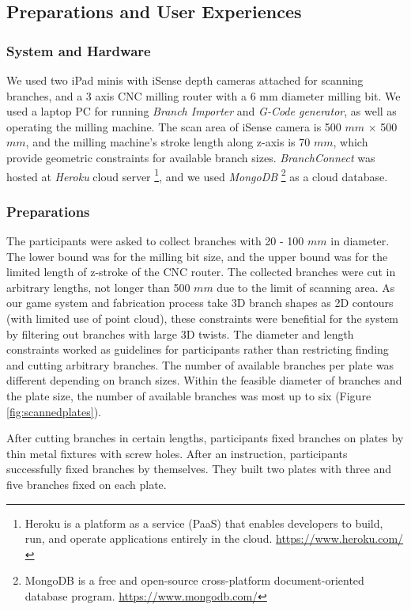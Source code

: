 \subsection{Preparations and User Experiences}
\subsubsection*{System and Hardware}
We used two iPad minis with iSense depth cameras attached for scanning branches, and a 3 axis CNC milling router with a 6 mm diameter milling bit.
We used a laptop PC for running \textit{Branch Importer} and \textit{G-Code generator}, as well as operating the milling machine.
The scan area of iSense camera is 500 $mm$ $\times$ 500 $mm$, and the milling machine's stroke length along z-axis is 70 $mm$, which provide geometric constraints for available branch sizes.
\textit{BranchConnect} was hosted at \textit{Heroku} cloud server \footnote{Heroku is a platform as a service (PaaS) that enables developers to build, run, and operate applications entirely in the cloud. \url{https://www.heroku.com/}},
and we used \textit{MongoDB} \footnote{MongoDB is a free and open-source cross-platform document-oriented database program. \url{https://www.mongodb.com/}} as a cloud database.

\subsubsection*{Preparations}
The participants were asked to collect branches with 20 - 100 $mm$ in diameter.
The lower bound was for the milling bit size, and the upper bound was for the limited length of z-stroke of the CNC router.
The collected branches were cut in arbitrary lengths, not longer than 500 $mm$ due to the limit of scanning area. 
As our game system and fabrication process take 3D branch shapes as 2D contours (with limited use of point cloud), these constraints were benefitial for the system by filtering out branches with large 3D twists.
The diameter and length constraints worked as guidelines for participants rather than restricting finding and cutting arbitrary branches.
The number of available branches per plate was different depending on branch sizes.
Within the feasible diameter of branches and the plate size, the number of available branches was  most up to six (Figure \ref{fig:scannedplates}).

After cutting branches in certain lengths, participants fixed branches on plates by thin metal fixtures with screw holes.
After an instruction, participants successfully fixed branches by themselves.
They built two plates with three and five branches fixed on each plate.

